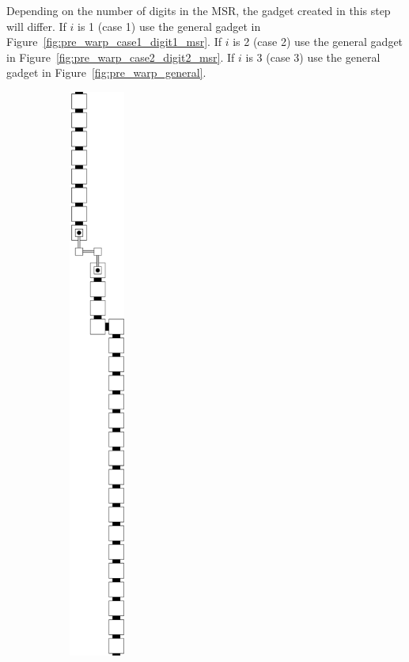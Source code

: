 \begin{itemize}
\begin{itemize}
            Depending on the number of digits in the MSR, the gadget created in this step will differ.
            If $i$ is 1 (case 1) use the general gadget in Figure~\ref{fig:pre_warp_case1_digit1_msr}.
            If $i$ is 2 (case 2) use the general gadget in Figure~\ref{fig:pre_warp_case2_digit2_msr}.
            If $i$ is 3 (case 3) use the general gadget in Figure~\ref{fig:pre_warp_general}.
        \end{itemize}
        \vspace{.5cm}

        \begin{figure}[H]
            \begin{subfigure}[t]{0.2\textwidth}
                \centering
                \includegraphics[width=0.2\textwidth]{warping/pre_warp_general}

\end{subfigure}
\end{figure}
\end{itemize}
